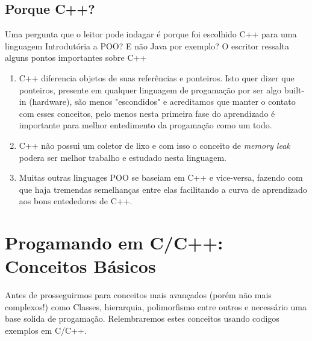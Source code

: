 \documentclass{amsbook}
\begin{document}
\section{Porque C++?}
	Uma pergunta que o leitor pode indagar é porque foi escolhido C++ para uma linguagem Introdutória a POO? E não Java por exemplo? O escritor ressalta alguns pontos importantes sobre C++
	\begin{enumerate}
		\item C++ diferencia objetos de suas referências e ponteiros. Isto quer dizer que ponteiros, presente em qualquer linguagem de progamação por ser algo built-in (hardware), são menos "escondidos" e acreditamos que manter o contato com esses conceitos, pelo menos nesta primeira fase do aprendizado é importante para melhor entedimento da progamação como um todo.

		\item C++ não possui um coletor de lixo e com isso o conceito de \textit{memory leak} podera ser melhor trabalho e estudado nesta linguagem.

		\item Muitas outras linguages POO se baseiam em C++ e vice-versa, fazendo com que haja tremendas semelhanças entre elas facilitando a curva de aprendizado aos bons entededores de C++.

	\end{enumerate}

\chapter{Progamando em C/C++: Conceitos Básicos}
	Antes de prosseguirmos para conceitos mais avançados (porém não mais complexos!) como Classes, hierarquia, polimorfismo entre outros e necessário uma base solida de progamação. Relembraremos estes conceitos usando codigos exemplos em C/C++.
\end{document}
